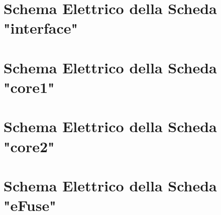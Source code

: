 \appendix

\chapter{Schema Elettrico della Scheda "interface"}


\chapter{Schema Elettrico della Scheda "core1"}


\chapter{Schema Elettrico della Scheda "core2"}


\chapter{Schema Elettrico della Scheda "eFuse"}
